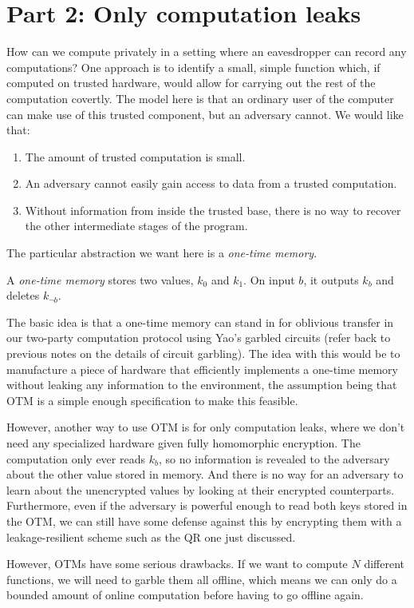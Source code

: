\documentclass[10pt]{article}
\begin{document}
\section{Part 2: Only computation leaks}

How can we compute privately in a setting where an eavesdropper can record any computations? One approach is to identify a small, simple function which, if computed on trusted hardware, would allow for carrying out the rest of the computation covertly. The model here is that an ordinary user of the computer can make use of this trusted component, but an adversary cannot. We would like that:
\begin{enumerate}
\item The amount of trusted computation is small.
\item An adversary cannot easily gain access to data from a trusted computation.
\item Without information from inside the trusted base, there is no way to recover the other intermediate stages of the program.
\end{enumerate}

The particular abstraction we want here is a \emph{one-time memory}.

\begin{definition}
A \emph{one-time memory} stores two values, $k_0$ and $k_1$. On input $b$, it outputs $k_b$ and deletes $k_{\neg b}$.
\end{definition}

The basic idea is that a one-time memory can stand in for oblivious transfer in our two-party computation protocol using Yao's garbled circuits (refer back to previous notes on the details of circuit garbling). The idea with this would be to manufacture a piece of hardware that efficiently implements a one-time memory without leaking any information to the environment, the assumption being that OTM is a simple enough specification to make this feasible.

However, another way to use OTM is for only computation leaks, where we don't need any specialized hardware given fully homomorphic encryption. The computation only ever reads $k_b$, so no information is revealed to the adversary about the other value stored in memory. And there is no way for an adversary to learn about the unencrypted values by looking at their encrypted counterparts. Furthermore, even if the adversary is powerful enough to read both keys stored in the OTM, we can still have some defense against this by encrypting them with a leakage-resilient scheme such as the QR one just discussed.

However, OTMs have some serious drawbacks. If we want to compute $N$ different functions, we will need to garble them all offline, which means we can only do a bounded amount of online computation before having to go offline again.


\nocite{*}


\end{document}
